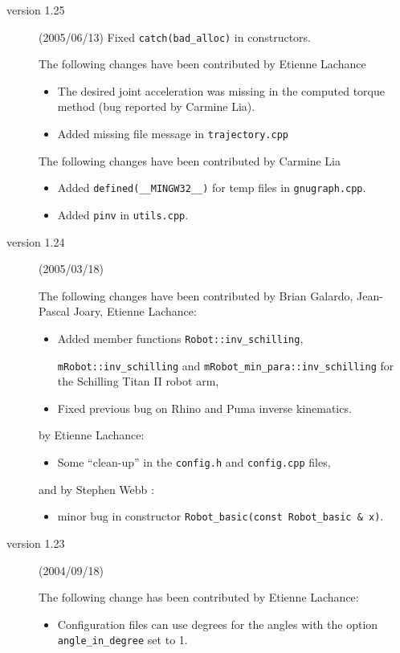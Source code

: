 \documentclass[11pt,fleqn,letterpaper]{report}
\begin{document}
\begin{description}
\item[version 1.25] (2005/06/13)
  Fixed \texttt{catch(bad\_alloc)} in constructors.
  
  The following changes have been contributed by Etienne Lachance
  \begin{itemize}
  \item The desired joint acceleration was missing in the computed
    torque method (bug reported by Carmine Lia).
  \item Added missing file message in \texttt{trajectory.cpp}
  \end{itemize}
  The following changes have been contributed by Carmine Lia
  \begin{itemize}
  \item Added \texttt{defined(\_\_MINGW32\_\_)} for temp files in
    \texttt{gnugraph.cpp}.
  \item Added \texttt{pinv} in \texttt{utils.cpp}.
  \end{itemize}

\item[version 1.24] (2005/03/18) 
  
  The following changes have been contributed by Brian Galardo,
  Jean-Pascal Joary, Etienne Lachance:
  \begin{itemize}
  \item Added member functions \texttt{Robot::inv\_schilling}, \par
    \texttt{mRobot::inv\_schilling} and
    \texttt{mRobot\_min\_para::inv\_schilling} for the
    \textsf{Schilling Titan II} robot arm,
  \item Fixed previous bug on Rhino and Puma inverse kinematics.
  \end{itemize}
  by Etienne Lachance: 
  \begin{itemize}
  \item Some ``clean-up'' in the \texttt{config.h} and
    \texttt{config.cpp} files,
  \end{itemize}
  and by Stephen Webb :
  \begin{itemize}
  \item minor bug in constructor \texttt{Robot\_basic(const
      Robot\_basic \& x)}.
  \end{itemize}

\item[version 1.23] (2004/09/18) 

  The following change has been contributed by Etienne Lachance: 
  \begin{itemize}
  \item Configuration files can use degrees for the angles with the
    option \texttt{angle\_in\_degree} set to 1.
  \end{itemize}


\end{description}
\end{document}

